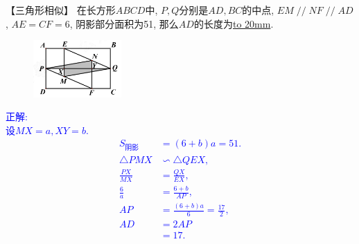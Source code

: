 \item {
    【三角形相似】
    在长方形$ABCD$中, $P,Q$分别是$AD,BC$的中点, $EM\mathop{//}NF\mathop{//}AD$, $AE=CF=6$, 阴影部分面积为51, 那么$AD$的长度为\underline{\hbox to 20mm{}}.
    \begin{figure}[H] 
        \centering
        \includegraphics[width=0.3\textwidth]{./pics/Chapter_2/1.png}
    \end{figure}
    \ifshowSolution 
        \fangsong{}\textcolor{blue}{
            正解: \\
            设$MX=a, XY =b$.\\
            \begin{align*}
                S_{阴影} &= (6+b)a = 51. \\
                \triangle PMX &\backsim \triangle QEX,\\
                \frac{PX}{MX} &= \frac{QX}{EX}, \\
                \frac{6}{a} &= \frac{6+b}{AP}, \\
                AP &= \frac{(6+b)a}{6} = \frac{17}{2}, \\
                AD &= 2AP \\
                &= 17. \\
            \end{align*}
        }
    \else
        \vspace{1cm}
    \fi
}

